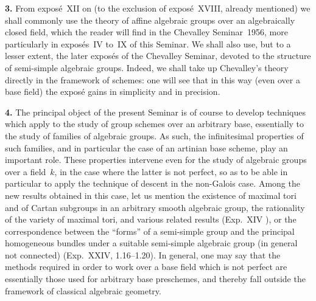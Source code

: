 \par{}
\noindent\textbf{3.}\label{Intro.sec.3}
From expos\'e~XII on (to the exclusion of expos\'e~XVIII, already mentioned)
we shall commonly use the theory of affine algebraic groups over an
algebraically closed field, which the reader will find in the Chevalley
Seminar~1956, more particularly in expos\'es~IV to~IX of this Seminar. We
shall also use, but to a lesser extent, the later expos\'es of the Chevalley
Seminar, devoted to the structure of semi-simple algebraic groups. Indeed,
we shall take up Chevalley's theory directly in the framework of schemes:
one will see that in this way (even over a base field) the expos\'e gains in
simplicity and in precision.

\par{}
\noindent\textbf{4.}\label{Intro.sec.4}
The principal object of the present Seminar is of course to develop
techniques which apply to the study of group schemes over an arbitrary base,
\ie essentially to the study of families of algebraic groups. As such, the
infinitesimal properties of such families, and in particular the case of an
artinian base scheme, play an important role. These properties intervene
even for the study of algebraic groups over a field~$k$, in the case where
the latter is not perfect, so as to be able in particular to apply the
technique of descent in the non-Galois case. Among the new results obtained
in this case, let us mention the existence of maximal tori and of Cartan
subgroups in an arbitrary smooth algebraic group, the rationality of the
variety of maximal tori, and various related results
(Exp.~XIV
{\renewcommand{\thefootnote}{(3)}}),
or the correspondence between the ``forms'' of a semi-simple group and the
principal homogeneous bundles under a suitable semi-simple algebraic group
(in general not connected) (Exp.~XXIV, 1.16--1.20). In general, one may say
that the methods required in order to work over a base field which is not
perfect are essentially those used for arbitrary base preschemes, and
thereby fall outside the framework of classical algebraic geometry.

